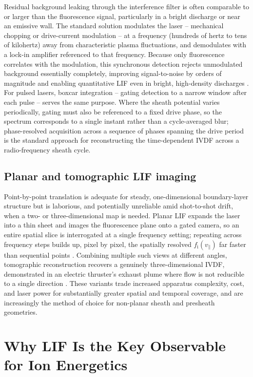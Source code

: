 Residual background leaking through the interference filter is often comparable to or larger than the fluorescence signal, particularly in a bright discharge or near an emissive wall. The standard solution modulates the laser -- mechanical chopping or drive-current modulation -- at a frequency (hundreds of hertz to tens of kilohertz) away from characteristic plasma fluctuations, and demodulates with a lock-in amplifier referenced to that frequency. Because only fluorescence correlates with the modulation, this synchronous detection rejects unmodulated background essentially completely, improving signal-to-noise by orders of magnitude and enabling quantitative LIF even in bright, high-density discharges \cite{ref0292}. For pulsed lasers, boxcar integration -- gating detection to a narrow window after each pulse -- serves the same purpose. Where the sheath potential varies periodically, gating must also be referenced to a fixed drive phase, so the spectrum corresponds to a single instant rather than a cycle-averaged blur; phase-resolved acquisition across a sequence of phases spanning the drive period is the standard approach for reconstructing the time-dependent IVDF across a radio-frequency sheath cycle.

\subsection{Planar and tomographic LIF imaging}

Point-by-point translation is adequate for steady, one-dimensional boundary-layer structure but is laborious, and potentially unreliable amid shot-to-shot drift, when a two- or three-dimensional map is needed. Planar LIF expands the laser into a thin sheet and images the fluorescence plane onto a gated camera, so an entire spatial slice is interrogated at a single frequency setting; repeating across frequency steps builds up, pixel by pixel, the spatially resolved $f_{\mathrm{i}}(v_{\parallel})$ far faster than sequential points \cite{ref0304}. Combining multiple such views at different angles, tomographic reconstruction recovers a genuinely three-dimensional IVDF, demonstrated in an electric thruster's exhaust plume where flow is not reducible to a single direction \cite{ref0328}. These variants trade increased apparatus complexity, cost, and laser power for substantially greater spatial and temporal coverage, and are increasingly the method of choice for non-planar sheath and presheath geometries.

\section{Why LIF Is the Key Observable for Ion Energetics}

